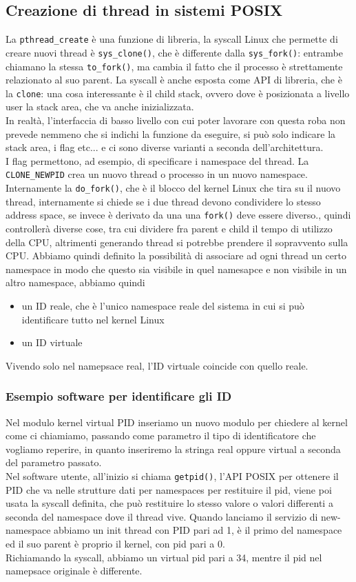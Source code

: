 \documentclass[12pt, oneside]{extbook}
\begin{document}
\subsection{Creazione di thread in sistemi POSIX}
La \texttt{pthread\_create} è una funzione di libreria, la syscall Linux che permette di creare nuovi thread è \texttt{sys\_clone()}, che è differente dalla \texttt{sys\_fork()}: entrambe chiamano la stessa \texttt{to\_fork()}, ma cambia il fatto che il processo è strettamente relazionato al suo parent. La syscall è anche esposta come API di libreria, che è la \texttt{clone}: una cosa interessante è il child stack, ovvero dove è posizionata a livello user la stack area, che va anche inizializzata.\\In realtà, l'interfaccia di basso livello con cui poter lavorare con questa roba non prevede nemmeno che si indichi la funzione da eseguire, si può solo indicare la stack area, i flag etc... e ci sono diverse varianti a seconda dell'architettura.\\ I flag permettono, ad esempio, di specificare i namespace del thread. La \texttt{CLONE\_NEWPID} crea un nuovo thread o processo in un nuovo namespace.\\Internamente la \texttt{do\_fork()}, che è il blocco del kernel Linux che tira su il nuovo thread, internamente si chiede se i due thread devono condividere lo stesso address space, se invece è derivato da una una \texttt{fork()} deve essere diverso., quindi controllerà diverse cose, tra cui dividere fra parent e child il tempo di utilizzo della CPU, altrimenti generando thread si potrebbe prendere il sopravvento sulla CPU. Abbiamo quindi definito la possibilità di associare ad ogni thread un certo namespace in modo che questo sia visibile in quel namesapce e non visibile in un altro namespace, abbiamo quindi 
\begin{itemize}
\item un ID reale, che è l'unico namespace reale del sistema in cui si può identificare tutto nel kernel Linux
\item un ID virtuale
\end{itemize}
Vivendo solo nel namepsace real, l'ID virtuale coincide con quello reale.
\subsubsection{Esempio software per identificare gli ID}
Nel modulo kernel virtual PID inseriamo un nuovo modulo per chiedere al kernel come ci chiamiamo, passando come parametro il tipo di identificatore che vogliamo reperire, in quanto inseriremo la stringa real oppure virtual a seconda del parametro passato.\\Nel software utente, all'inizio si chiama \texttt{getpid()}, l'API POSIX per ottenere il PID che va nelle strutture dati per namespaces per restituire il pid, viene poi usata la syscall definita, che può restituire lo stesso valore o valori differenti a seconda del namespace dove il thread vive. Quando lanciamo il servizio di new-namespace abbiamo un init thread con PID pari ad 1, è il primo del namespace ed il suo parent è proprio il kernel, con pid pari a 0.\\Richiamando la syscall, abbiamo un virtual pid pari a 34, mentre il pid nel namepsace originale è differente.
\end{document}
